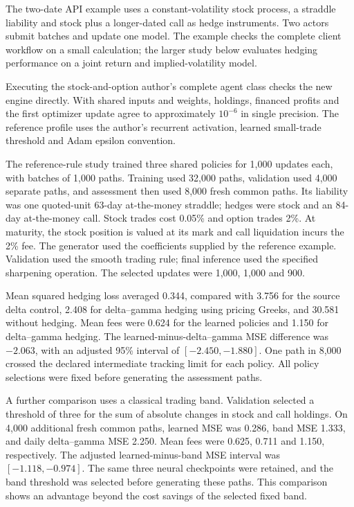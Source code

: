 \documentclass[8pt]{strategynet-journal}
\begin{document}
\begin{SNcolumns}
The two-date API example uses a constant-volatility stock process, a straddle
liability and stock plus a longer-dated call as hedge instruments. Two actors
submit batches and update one model. The example checks the complete client
workflow on a small calculation; the larger study below evaluates hedging
performance on a joint return and implied-volatility model.

Executing the stock-and-option author's complete agent class checks the new
engine directly. With shared inputs and weights, holdings, financed profits
and the first optimizer update agree to approximately $10^{-6}$ in single
precision. The reference profile uses the author's recurrent activation,
learned small-trade threshold and Adam epsilon convention.

The reference-rule study trained three shared policies for 1,000 updates each,
with batches of 1,000 paths. Training used 32,000 paths, validation used 4,000
separate paths, and assessment then used 8,000 fresh common paths. Its liability
was one quoted-unit 63-day at-the-money straddle; hedges were stock and an
84-day at-the-money call. Stock trades cost 0.05\% and option trades 2\%. At maturity, the stock
position is valued at its mark and call liquidation incurs the 2\% fee. The generator used the coefficients supplied by
the reference example. Validation used the smooth trading rule; final inference
used the specified sharpening operation. The selected updates were 1,000,
1,000 and 900.

Mean squared hedging loss averaged 0.344, compared with 3.756 for the source
delta control, 2.408 for delta--gamma hedging using pricing Greeks, and 30.581
without hedging. Mean fees were 0.624 for the learned policies and 1.150 for
delta--gamma hedging. The learned-minus-delta--gamma MSE difference was
$-2.063$, with an adjusted 95\% interval of $[-2.450,-1.880]$. One path in 8,000
crossed the declared intermediate tracking limit for each policy. All policy
selections were fixed before generating the assessment paths.

A further comparison uses a classical trading band. Validation selected a
threshold of three for the sum of absolute changes in stock and call holdings.
On 4,000 additional fresh common paths, learned MSE was 0.286, band MSE 1.333,
and daily delta--gamma MSE 2.250. Mean fees were 0.625, 0.711 and 1.150,
respectively. The adjusted learned-minus-band MSE interval was
$[-1.118,-0.974]$. The same three neural checkpoints were retained, and the
band threshold was selected before generating these paths. This comparison
shows an advantage beyond the cost savings of the selected fixed band.


\end{SNcolumns}
\end{document}

